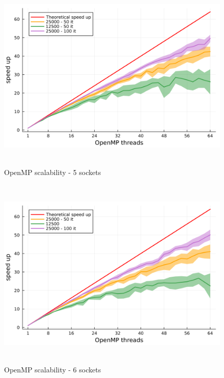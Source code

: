 \documentclass[
  letterpaper,
  DIV=11,
  numbers=noendperiod]{scrartcl}
\begin{document}
\begin{figure}

{\centering \includegraphics[width=\textwidth,height=3.64583in]{img/epyc_5_sockets.png}

}

\caption{OpenMP scalability - 5 sockets}

\end{figure}

\begin{figure}

{\centering \includegraphics[width=\textwidth,height=3.64583in]{img/epyc_6_sockets.png}

}

\caption{OpenMP scalability - 6 sockets}

\end{figure}
\end{document}
